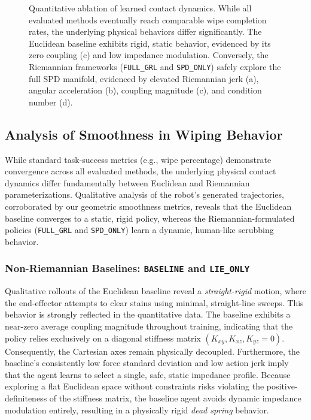 \documentclass[letterpaper, 10 pt, conference]{IEEEtran}
\begin{document}
\begin{figure}[htb!]
    \caption{Quantitative ablation of learned contact dynamics. While all evaluated methods eventually reach comparable wipe completion rates, the underlying physical behaviors differ significantly. The Euclidean baseline exhibits rigid, static behavior, evidenced by its zero coupling (c) and low impedance modulation. Conversely, the Riemannian frameworks (\texttt{FULL\_GRL} and \texttt{SPD\_ONLY}) safely explore the full SPD manifold, evidenced by elevated Riemannian jerk (a), angular acceleration (b), coupling magnitude (c), and condition number (d). }
    \label{fig:metrics_ablation}
\end{figure}
\subsection{Analysis of Smoothness in Wiping Behavior}
While standard task-success metrics (e.g., wipe percentage) demonstrate convergence across all evaluated methods, the underlying physical contact dynamics differ fundamentally between Euclidean and Riemannian parameterizations. Qualitative analysis of the robot's generated trajectories, corroborated by our geometric smoothness metrics, reveals that the Euclidean baseline converges to a static, rigid policy, whereas the Riemannian-formulated policies (\texttt{FULL\_GRL} and \texttt{SPD\_ONLY}) learn a dynamic, human-like scrubbing behavior.

\subsubsection*{Non-Riemannian Baselines: \texttt{BASELINE} and \texttt{LIE\_ONLY}}
Qualitative rollouts of the Euclidean baseline reveal a \textit{straight-rigid} motion, where the end-effector attempts to clear stains using minimal, straight-line sweeps. This behavior is strongly reflected in the quantitative data. The baseline exhibits a near-zero average coupling magnitude throughout training, indicating that the policy relies exclusively on a diagonal stiffness matrix $(K_{xy}, K_{xz}, K_{yz} = 0)$. Consequently, the Cartesian axes remain physically decoupled. Furthermore, the baseline's consistently low force standard deviation and low action jerk imply that the agent learns to select a single, safe, static impedance profile. Because exploring a flat Euclidean space without constraints risks violating the positive-definiteness of the stiffness matrix, the baseline agent avoids dynamic impedance modulation entirely, resulting in a physically rigid \textit{dead spring} behavior.
\end{document}
